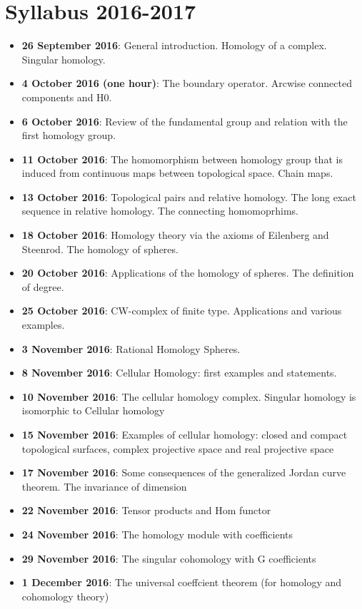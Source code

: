 \documentclass[10pt, twoside=false, x11names]{scrbook}
\begin{document}
\newpage

\chapter*{Syllabus 2016-2017}
\begin{itemize}
\item \textbf{26 September 2016}: General introduction. Homology of a complex. Singular homology.
\item \textbf{4 October 2016 (one hour)}: The boundary operator. Arcwise connected components and H0.
\item \textbf{6 October 2016}: Review of the fundamental group and relation with the first homology group.
\item \textbf{11 October 2016}: The homomorphism between homology group that is induced from continuous maps between topological space. Chain maps.
\item \textbf{13 October 2016}: Topological pairs and relative homology. The long exact sequence in relative homology. The connecting homomoprhims.
\item \textbf{18 October 2016}: Homology theory via the axioms of Eilenberg and Steenrod. The homology of spheres.
\item \textbf{20 October 2016}: Applications of the homology of spheres. The definition of degree.
\item \textbf{25 October 2016}: CW-complex of finite type. Applications and various examples.
\item \textbf{3 November 2016}: Rational Homology Spheres.
\item \textbf{8 November 2016}: Cellular Homology: first examples and statements.
\item \textbf{10 November 2016}: The cellular homology complex. Singular homology is isomorphic to Cellular homology
\item \textbf{15 November 2016}: Examples of cellular homology: closed and compact topological surfaces, complex projective space and real projective space
\item \textbf{17 November 2016}: Some consequences of the generalized Jordan curve theorem. The invariance of dimension
\item \textbf{22 November 2016}: Tensor products and Hom functor
\item \textbf{24 November 2016}: The homology module with coefficients
\item \textbf{29 November 2016}: The singular cohomology with G coefficients
\item \textbf{1 December 2016}: The universal coeffcient theorem (for homology and cohomology theory)

\end{itemize}
\end{document}
